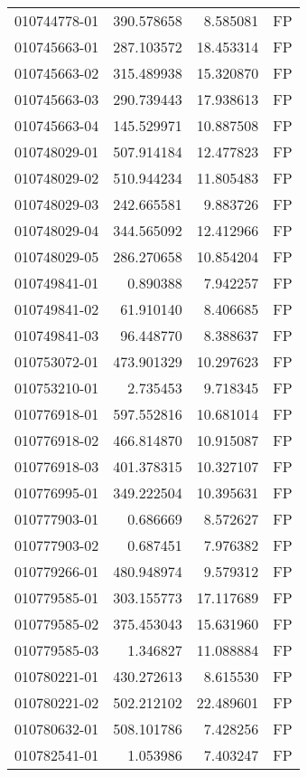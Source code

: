 \begin{tabular}{lrrl}
010744778-01 &  390.578658 &     8.585081 &   FP \\
010745663-01 &  287.103572 &    18.453314 &   FP \\
010745663-02 &  315.489938 &    15.320870 &   FP \\
010745663-03 &  290.739443 &    17.938613 &   FP \\
010745663-04 &  145.529971 &    10.887508 &   FP \\
010748029-01 &  507.914184 &    12.477823 &   FP \\
010748029-02 &  510.944234 &    11.805483 &   FP \\
010748029-03 &  242.665581 &     9.883726 &   FP \\
010748029-04 &  344.565092 &    12.412966 &   FP \\
010748029-05 &  286.270658 &    10.854204 &   FP \\
010749841-01 &    0.890388 &     7.942257 &   FP \\
010749841-02 &   61.910140 &     8.406685 &   FP \\
010749841-03 &   96.448770 &     8.388637 &   FP \\
010753072-01 &  473.901329 &    10.297623 &   FP \\
010753210-01 &    2.735453 &     9.718345 &   FP \\
010776918-01 &  597.552816 &    10.681014 &   FP \\
010776918-02 &  466.814870 &    10.915087 &   FP \\
010776918-03 &  401.378315 &    10.327107 &   FP \\
010776995-01 &  349.222504 &    10.395631 &   FP \\
010777903-01 &    0.686669 &     8.572627 &   FP \\
010777903-02 &    0.687451 &     7.976382 &   FP \\
010779266-01 &  480.948974 &     9.579312 &   FP \\
010779585-01 &  303.155773 &    17.117689 &   FP \\
010779585-02 &  375.453043 &    15.631960 &   FP \\
010779585-03 &    1.346827 &    11.088884 &   FP \\
010780221-01 &  430.272613 &     8.615530 &   FP \\
010780221-02 &  502.212102 &    22.489601 &   FP \\
010780632-01 &  508.101786 &     7.428256 &   FP \\
010782541-01 &    1.053986 &     7.403247 &   FP \\

\end{tabular}
